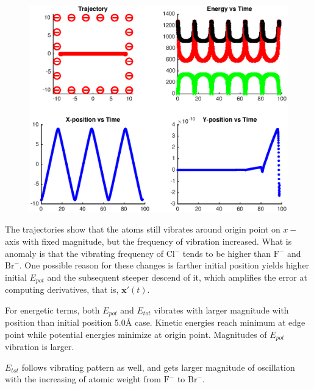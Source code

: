\documentclass{article}
\begin{document}
\begin{figure}[h]
    \centering
    \includegraphics[scale=0.76]{10}
\end{figure}

\vspace{-14mm}

\newpage
\noindent
The trajectories show that the atoms still vibrates around origin point on $x-$axis with fixed magnitude, but the frequency of vibration increased. What is anomaly is that the vibrating frequency of $\text{Cl}^{-}$ tends to be higher than $\text{F}^{-}$ and $\text{Br}^{-}$. One possible reason for these changes is farther initial position yields higher initial $E_{pot}$ and the subsequent steeper descend of it, which amplifies the error at computing derivatives, that is, $\mathbf{x}'(t)$.

For energetic terms, both $E_{pot}$ and $E_{tot}$ vibrates with larger magnitude with position than initial position 5.0\r{A} case. Kinetic energies reach minimum at edge point while potential energies minimize at origin point. Magnitudes of $E_{pot}$ vibration is larger. 

$E_{tot}$ follows vibrating pattern as well, and gets larger magnitude of oscillation with the increasing of atomic weight from $\text{F}^{-}$ to $\text{Br}^{-}$.

\newpage
\end{document}
